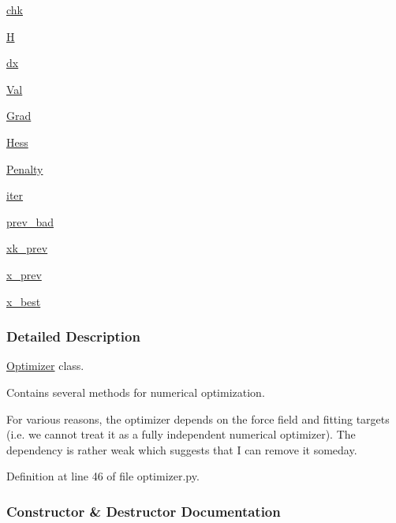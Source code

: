 \begin{DoxyCompactItemize}
\item 
\hyperlink{classsrc_1_1optimizer_1_1Optimizer_a2d0160ffbd25b572fd0e4b26114a5d2b}{chk}
\item 
\hyperlink{classsrc_1_1optimizer_1_1Optimizer_aac43d13edf51e56a9af840c4edeb41c9}{H}
\item 
\hyperlink{classsrc_1_1optimizer_1_1Optimizer_a08e193bf17fa05764a4e3a5f68134bf2}{dx}
\item 
\hyperlink{classsrc_1_1optimizer_1_1Optimizer_af55d853379aa9f712413c0b65db94b30}{Val}
\item 
\hyperlink{classsrc_1_1optimizer_1_1Optimizer_a74c7a2eb94230c0c77f64b918a79268a}{Grad}
\item 
\hyperlink{classsrc_1_1optimizer_1_1Optimizer_aa04d94365b7c6e6a8339d069fbd2493a}{Hess}
\item 
\hyperlink{classsrc_1_1optimizer_1_1Optimizer_ad0448061fef8846bece7e5c9a40d2380}{Penalty}
\item 
\hyperlink{classsrc_1_1optimizer_1_1Optimizer_ac5d3b97806c50722bee5f42481cd241f}{iter}
\item 
\hyperlink{classsrc_1_1optimizer_1_1Optimizer_a516d6f709220615ab7f7d17d768b695d}{prev\+\_\+bad}
\item 
\hyperlink{classsrc_1_1optimizer_1_1Optimizer_ab64002970e3058166b25dc54cb16a426}{xk\+\_\+prev}
\item 
\hyperlink{classsrc_1_1optimizer_1_1Optimizer_aa744302d95dc8b20bdf80209385e059e}{x\+\_\+prev}
\item 
\hyperlink{classsrc_1_1optimizer_1_1Optimizer_a55944d77d9551e824c198aa4556f2b85}{x\+\_\+best}
\end{DoxyCompactItemize}


\subsubsection{Detailed Description}
\hyperlink{classsrc_1_1optimizer_1_1Optimizer}{Optimizer} class. 

Contains several methods for numerical optimization.

For various reasons, the optimizer depends on the force field and fitting targets (i.\+e. we cannot treat it as a fully independent numerical optimizer). The dependency is rather weak which suggests that I can remove it someday. 

Definition at line 46 of file optimizer.\+py.



\subsubsection{Constructor \& Destructor Documentation}
\mbox{\label{classsrc_1_1optimizer_1_1Optimizer_acdeb46fca44a2f74dad4e3ae1fa9bebf}} 
